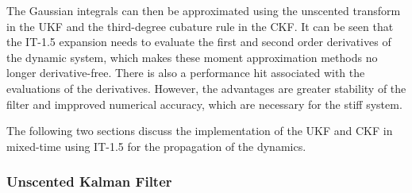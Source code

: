 \documentclass[../zhang_thesis.tex]{subfiles}
\begin{document}
The Gaussian integrals can then be approximated using the unscented transform in the UKF and the third-degree cubature rule in the CKF. It can be seen that the IT-1.5 expansion needs to evaluate the first and second order derivatives of the dynamic system, which makes these moment approximation methods no longer derivative-free. There is also a performance hit associated with the evaluations of the derivatives. However, the advantages are greater stability of the filter and impproved numerical accuracy, which are necessary for the stiff system.

The following two sections discuss the implementation of the UKF and CKF in mixed-time using IT-1.5 for the propagation of the dynamics.

\subsubsection{Unscented Kalman Filter}
\end{document}
